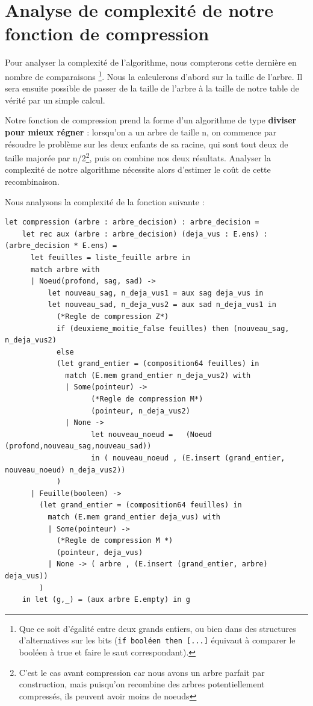 \documentclass[12pt,a4paper]{article}
\begin{document}
\section{Analyse de complexité de notre fonction de compression}

Pour analyser la complexité de l'algorithme, nous compterons cette dernière en nombre de comparaisons \footnote{Que ce soit d'égalité entre deux grands entiers, ou bien dans des structures d'alternatives sur les bits (\texttt{if booléen then [...]} équivaut à comparer le booléen à true et faire le saut correspondant).}. Nous la calculerons d'abord sur la taille de l'arbre. Il sera ensuite possible de passer de la taille de l'arbre à la taille de notre table de vérité par un simple calcul.


Notre fonction de compression prend la forme d'un algorithme de type \textbf{diviser pour mieux régner} : lorsqu'on a un arbre de taille n, on commence par résoudre le problème sur les deux enfants de sa racine, qui sont tout deux de taille majorée par n/2\footnote{C'est le cas avant compression car nous avons un arbre parfait par construction, mais puisqu'on recombine des arbres potentiellement compressés, ils peuvent avoir moins de noeuds}, puis on combine nos deux résultats. Analyser la complexité de notre algorithme nécessite alors d'estimer le coût de cette recombinaison. 

Nous analysons la complexité de la fonction suivante : 

\begin{lstlisting}[basicstyle=\scriptsize]
let compression (arbre : arbre_decision) : arbre_decision = 
    let rec aux (arbre : arbre_decision) (deja_vus : E.ens) : (arbre_decision * E.ens) = 
      let feuilles = liste_feuille arbre in 
      match arbre with
      | Noeud(profond, sag, sad) -> 
          let nouveau_sag, n_deja_vus1 = aux sag deja_vus in
          let nouveau_sad, n_deja_vus2 = aux sad n_deja_vus1 in 
          	(*Regle de compression Z*)
            if (deuxieme_moitie_false feuilles) then (nouveau_sag, n_deja_vus2)
            else 
            (let grand_entier = (composition64 feuilles) in 
              match (E.mem grand_entier n_deja_vus2) with     
              | Some(pointeur) ->
              		(*Regle de compression M*)
              		(pointeur, n_deja_vus2) 
              | None -> 
                	let nouveau_noeud =   (Noeud (profond,nouveau_sag,nouveau_sad))  
                  	in ( nouveau_noeud , (E.insert (grand_entier, nouveau_noeud) n_deja_vus2))    
            )
      | Feuille(booleen) ->  
        (let grand_entier = (composition64 feuilles) in 
          match (E.mem grand_entier deja_vus) with     
          | Some(pointeur) -> 
          	(*Regle de compression M *) 
            (pointeur, deja_vus)                             
          | None -> ( arbre , (E.insert (grand_entier, arbre) deja_vus))             
        )
    in let (g,_) = (aux arbre E.empty) in g

\end{lstlisting}
\end{document}
